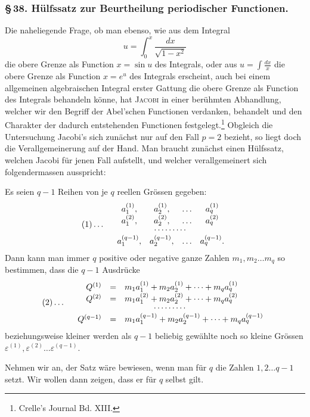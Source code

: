 \documentclass[10pt]{article}
\begin{document}
\subsubsection*{\S\,38. Hülfssatz zur Beurtheilung periodischer Functionen.}

Die naheliegende Frage, ob man ebenso, wie aus dem Integral
\[u=\int_0^x\frac{dx}{\sqrt{1-x^2}}
\]
die obere Grenze als Function \(x=\sin u\) des Integrals, oder aus \(u=\int\frac{dx}{x}\) die obere Grenze als Function \(x=e^u\) des Integrals erscheint, auch bei einem allgemeinen algebraischen Integral erster Gattung die obere Grenze als Function des Integrals behandeln könne, hat \textsc{Jacobi} in einer berühmten Abhandlung, welcher wir den Begriff der Abel'schen Functionen verdanken, behandelt und den Charakter der dadurch entstehenden Functionen festgelegt.\footnote{Crelle's Journal Bd. XIII.} Obgleich die Untersuchung Jacobi's sich zunächst nur auf den Fall \(p=2\) bezieht, so liegt doch die Verallgemeinerung auf der Hand. Man braucht zunächst einen Hülfssatz, welchen Jacobi für jenen Fall aufstellt, und welcher verallgemeinert sich folgendermassen ausspricht:

Es seien \(q-1\) Reihen von je \(q\) reellen Grössen gegeben:
\[
(1)\ldots\quad
\begin{array}{cccc}
a_1^{(1)},&a_2^{(1)},&\ldots&a_q^{(1)}\\
a_1^{(2)},&a_2^{(2)},&\ldots&a_q^{(2)}\\[-0.15em]
\multicolumn{4}{c}{\cdots\cdots\cdots}\\
a_1^{(q-1)},&a_2^{(q-1)},&\ldots&a_q^{(q-1)}.
\end{array}
\]
Dann kann man immer \(q\) positive oder negative ganze Zahlen \(m_1,m_2\ldots m_q\) so bestimmen, dass die \(q-1\) Ausdrücke
\[
(2)\ldots\quad
\begin{array}{rcl}
Q^{(1)}&=&m_1a_1^{(1)}+m_2a_2^{(1)}+\cdots+m_qa_q^{(1)}\\
Q^{(2)}&=&m_1a_1^{(2)}+m_2a_2^{(2)}+\cdots+m_qa_q^{(2)}\\[-0.15em]
\multicolumn{3}{c}{\cdots\cdots\cdots}\\
Q^{(q-1)}&=&m_1a_1^{(q-1)}+m_2a_2^{(q-1)}+\cdots+m_qa_q^{(q-1)}
\end{array}
\]
beziehungsweise kleiner werden als \(q-1\) beliebig gewählte noch so kleine Grössen \(\varepsilon^{(1)},\varepsilon^{(2)}\ldots\varepsilon^{(q-1)}\).

Nehmen wir an, der Satz wäre bewiesen, wenn man für \(q\) die Zahlen \(1,2\ldots q-1\) setzt. Wir wollen dann zeigen, dass er für \(q\) selbst gilt.
\end{document}
